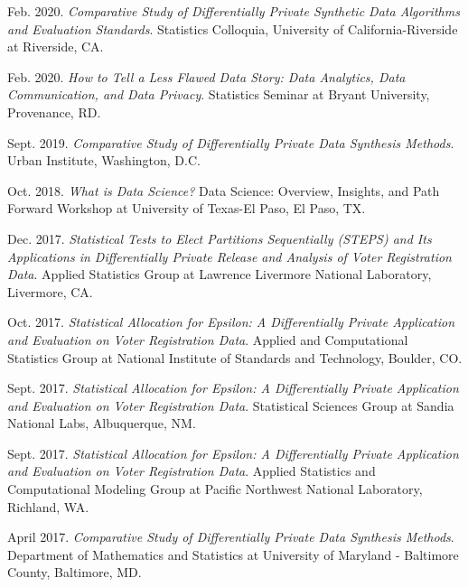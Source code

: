 \begin{etaremune}[topsep=0pt, itemsep=4pt, partopsep=0pt, parsep=0pt]
    \item Feb. 2020. \textit{Comparative Study of Differentially Private Synthetic Data Algorithms and Evaluation Standards}. Statistics Colloquia, University of California-Riverside at Riverside, CA.
    
    \item Feb. 2020. \textit{How to Tell a Less Flawed Data Story: Data Analytics, Data Communication, and Data Privacy}. Statistics Seminar at Bryant University, Provenance, RD.
    
    \item Sept. 2019. \textit{Comparative Study of Differentially Private Data Synthesis Methods}. Urban Institute, Washington, D.C.
    
    \item Oct. 2018. \textit{What is Data Science?} Data Science: Overview, Insights, and Path Forward Workshop at University of Texas-El Paso, El Paso, TX.
    
    \item Dec. 2017. \textit{Statistical Tests to Elect Partitions Sequentially (STEPS) and Its Applications in Differentially Private Release and Analysis of Voter Registration Data}. Applied Statistics Group at Lawrence Livermore National Laboratory, Livermore, CA.
    
    \item Oct. 2017. \textit{Statistical Allocation for Epsilon: A Differentially Private Application and Evaluation on Voter Registration Data}. Applied and Computational Statistics Group at National Institute of Standards and Technology, Boulder, CO.
    
    \item Sept. 2017. \textit{Statistical Allocation for Epsilon: A Differentially Private Application and Evaluation on Voter Registration Data}. Statistical Sciences Group at Sandia National Labs, Albuquerque, NM.
    
    \item Sept. 2017. \textit{Statistical Allocation for Epsilon: A Differentially Private Application and Evaluation on Voter Registration Data}. Applied Statistics and Computational Modeling Group at Pacific Northwest National Laboratory, Richland, WA.
    
    \item April 2017. \textit{Comparative Study of Differentially Private Data Synthesis Methods}. Department of Mathematics and Statistics at University of Maryland - Baltimore County, Baltimore, MD.
    

\end{etaremune}
